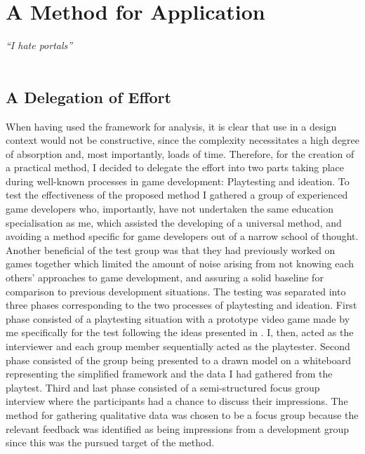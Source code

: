 \chapter{A Method for Application}
\textit{``I hate portals''} \\
 \\

\section{A Delegation of Effort}
When having used the framework for analysis, it is clear that use in a design context would not be constructive, since the complexity necessitates a high degree of absorption and, most importantly, loads of time. Therefore, for the creation of a practical method, I decided to delegate the effort into two parts taking place during well-known processes in game development: Playtesting and ideation. To test the effectiveness of the proposed method I gathered a group of experienced game developers who, importantly, have not undertaken the same education specialisation as me, which assisted the developing of a universal method, and avoiding a method specific for game developers out of a narrow school of thought. Another beneficial of the test group was that they had previously worked on games together which limited the amount of noise arising from not knowing each others' approaches to game development, and assuring a solid baseline for comparison to previous development situations. The testing was separated into three phases corresponding to the two processes of playtesting and ideation. First phase consisted of a playtesting situation with a prototype video game made by me specifically for the test following the ideas presented in . I, then, acted as the interviewer and each group member sequentially acted as the playtester. Second phase consisted of the group being presented to a drawn model on a whiteboard representing the simplified framework and the data I had gathered from the playtest. Third and last phase consisted of a semi-structured focus group interview \cite{cresswell} where the participants had a chance to discuss their impressions. The method for gathering qualitative data was chosen to be a focus group because the relevant feedback was identified as being impressions from a development group since this was the pursued target of the method.

